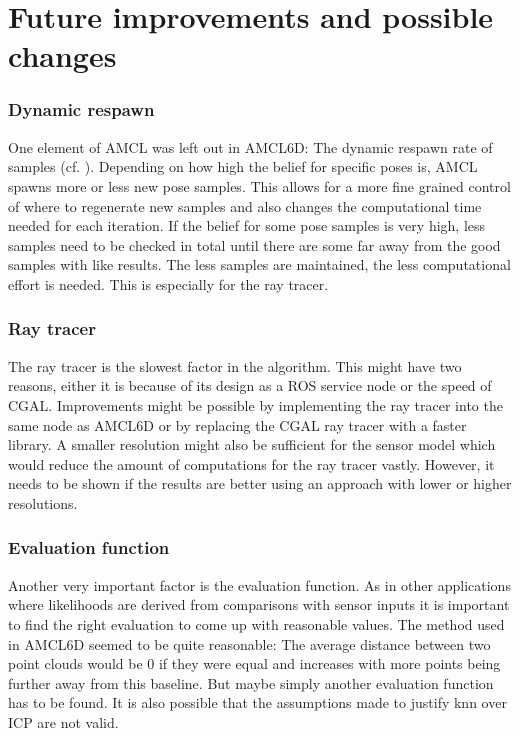 \documentclass[Thesis.tex]{subfiles}
\begin{document}
\chapter{Future improvements and possible changes}

\subsection*{Dynamic respawn}

One element of \gls{AMCL} was left out in \gls{AMCL6D}: The dynamic respawn rate of samples (cf. \cite{ThrunBurgardFox:2005}). Depending on how high the belief for specific poses is, \gls{AMCL} spawns more or less new pose samples. This allows for a more fine grained control of where to regenerate new samples and also changes the computational time needed for each iteration. If the belief for some pose samples is very high, less samples need to be checked in total until there are some far away from the good samples with like results. The less samples are maintained, the less computational effort is needed. This is especially for the ray tracer.

\subsection*{Ray tracer}

The ray tracer is the slowest factor in the algorithm. This might have two reasons, either it is because of its design as a \gls{ROS} service node or the speed of \gls{CGAL}. Improvements might be possible by implementing the ray tracer into the same node as \gls{AMCL6D} or by replacing the \gls{CGAL} ray tracer with a faster library. A smaller resolution might also be sufficient for the sensor model which would reduce the amount of computations for the ray tracer vastly. However, it needs to be shown if the results are better using an approach with lower or higher resolutions.

\subsection*{Evaluation function}

Another very important factor is the evaluation function. As in other applications where likelihoods are derived from comparisons with sensor inputs it is important to find the right evaluation to come up with reasonable values. The method used in \gls{AMCL6D} seemed to be quite reasonable: The average distance between two point clouds would be 0 if they were equal and increases with more points being further away from this baseline. But maybe simply another evaluation function has to be found. It is also possible that the assumptions made to justify \gls{knn} over \gls{ICP} are not valid. 
\end{document}
